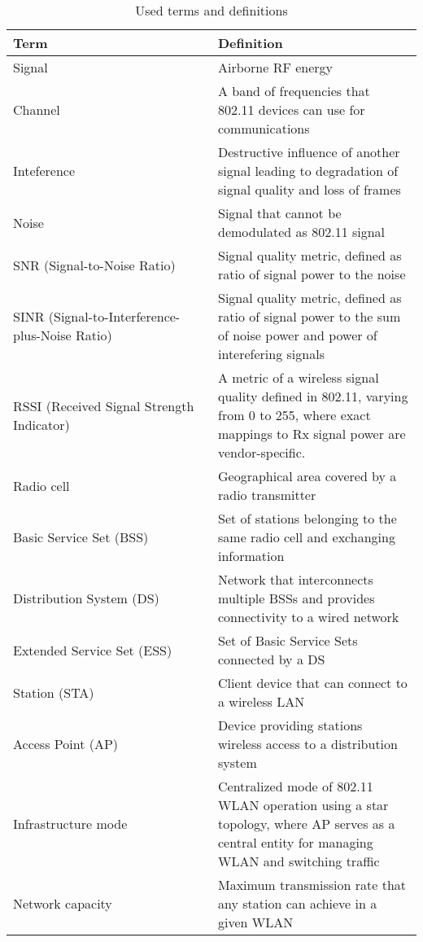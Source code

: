 \appendix

\makeatletter
\let\@currsize\normalsize
\makeatother
\label{defs_table}
\begin{table}[h]
    \centering
    \begin{tabular}{| p{0.5\linewidth} | p{0.5\linewidth} |}\hline
        \textbf{Term} & \textbf{Definition} \\ \hline
        Signal & Airborne RF energy \\
        \hline
        Channel & A band of frequencies that 802.11 devices can use for communications \cite{AuthoritativeDictionaryIEEE2000} \\
        \hline
        Inteference & Destructive influence of another signal leading to degradation of signal quality and loss of frames \\
        \hline
        Noise & Signal that cannot be demodulated as 802.11 signal \\
        \hline
        SNR (Signal-to-Noise Ratio) & Signal quality metric, defined as ratio of signal power to the noise \\
        \hline
        SINR (Signal-to-Interference-plus-Noise Ratio) & Signal quality metric, defined as ratio of signal power to the sum of noise power and power of interefering signals \\
        \hline
        RSSI (Received Signal Strength Indicator) & A metric of a wireless signal quality defined in 802.11, varying from 0 to 255, where exact mappings to Rx signal power are vendor-specific. \\
        \hline
        Radio cell & Geographical area covered by a radio transmitter \cite{tanenbaumComputerNetworks2020} \\
        \hline
        Basic Service Set (BSS) & Set of stations belonging to the same radio cell and exchanging information \cite{konsgenSpectrumManagementAlgorithms2010} \\
        \hline
        Distribution System (DS) & Network that interconnects multiple BSSs and provides connectivity to a wired network \cite{konsgenSpectrumManagementAlgorithms2010} \\
        \hline
        Extended Service Set (ESS) & Set of Basic Service Sets connected by a DS \cite{konsgenSpectrumManagementAlgorithms2010} \\
        \hline
        Station (STA) & Client device that can connect to a wireless LAN \\
        \hline
        Access Point (AP) & Device providing stations wireless access to a distribution system \\
        \hline
        Infrastructure mode & Centralized mode of 802.11 WLAN operation using a star topology, where AP serves as a central entity for managing WLAN and switching traffic \\
        \hline
        Network capacity & Maximum transmission rate that any station can achieve in a given WLAN \\
        \hline
    \end{tabular}
    \caption{Used terms and definitions}
    \label{tab:my_label}
\end{table}
